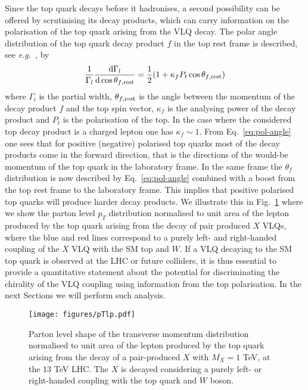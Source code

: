 \documentclass[a4paper]{article}
\begin{document}
Since the top quark decays before it hadronises, a second possibility can be offered by scrutinising its decay products, which can carry information on the polarisation of the top quark arising from the VLQ decay. The polar angle distribution of the top quark decay product $f$ in the top rest frame is described, see {\emph{e.g.}}~\cite{Belanger:2012tm}, by
\begin{equation}
\frac{1}{\Gamma_l} \frac{{\rm d} \Gamma_l}{{\rm d}\cos \theta_{f,{\rm rest}}}=\frac{1}{2}(1+\kappa_f P_t \cos\theta_{f,{\rm rest}})
\label{eq:pol-angle}
\end{equation}
where $\Gamma_l$ is the partial width, $\theta_{f,{\rm rest}}$ is the angle between the momentum of the decay product $f$ and the top spin vector, $\kappa_f$ is the analysing power of the decay product and $P_t$ is the polarisation of the top. In the case where the considered top decay product is a charged lepton one has $\kappa_f \sim 1$. From Eq.~\eqref{eq:pol-angle} one sees that for positive (negative) polarised top quarks most of the decay products come in the forward direction, that is the directions of the would-be momentum of the top quark in the laboratory frame. 
In the same frame the $\theta_{f}$ distribution is now described by Eq.~\eqref{eq:pol-angle} combined with a boost from the top rest frame to the laboratory frame. This implies that positive polarised top quarks will produce harder decay products. 
%
We illustrate this in Fig.~\ref{fig:LHC13-parton} where we show the parton level $p_T$ distribution normalised to unit area of the lepton produced by the top quark arising from the decay of pair produced $X$ VLQs, where the blue and red lines correspond to a purely left- and right-handed coupling of the $X$ VLQ with the SM top and $W$.
%
If a VLQ decaying to the SM top quark is observed at the LHC or future colliders, it is thus essential to provide a quantitative statement about the potential for discriminating the chirality of the VLQ coupling using information from the top polarisation. In the next Sections we will perform such analysis.

\begin{figure}[!htbp]
\centering
\texttt{[image: figures/pTlp.pdf]}\hfill
\caption{\label{fig:LHC13-parton} Parton level shape of the transverse momentum distribution normalised to unit area of the lepton produced by the top quark arising from the decay of a pair-produced $X$ with $M_X=1$ TeV, at the 13 TeV LHC. The $X$ is decayed considering a purely left- or right-handed coupling with the top quark and $W$ boson.}
\end{figure}
\end{document}
